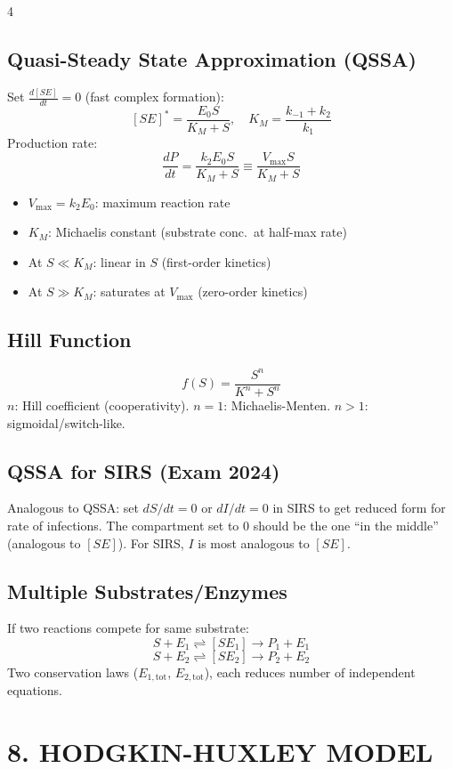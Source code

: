 \documentclass[8pt,landscape]{article}
\begin{document}
\begin{multicols}{4}
\subsection{Quasi-Steady State Approximation (QSSA)}
Set $\frac{d[SE]}{dt} = 0$ (fast complex formation):
\[
[SE]^* = \frac{E_0 S}{K_M + S}, \quad K_M = \frac{k_{-1} + k_2}{k_1}
\]
Production rate:
\[
\frac{dP}{dt} = \frac{k_2 E_0 S}{K_M + S} \equiv \frac{V_{\max} S}{K_M + S}
\]
\begin{itemize}
  \item $V_{\max} = k_2 E_0$: maximum reaction rate
  \item $K_M$: Michaelis constant (substrate conc.\ at half-max rate)
  \item At $S \ll K_M$: linear in $S$ (first-order kinetics)
  \item At $S \gg K_M$: saturates at $V_{\max}$ (zero-order kinetics)
\end{itemize}

\subsection{Hill Function}
\[
f(S) = \frac{S^n}{K^n + S^n}
\]
$n$: Hill coefficient (cooperativity). $n=1$: Michaelis-Menten. $n>1$: sigmoidal/switch-like.

\subsection{QSSA for SIRS (Exam 2024)}
Analogous to QSSA: set $dS/dt = 0$ or $dI/dt = 0$ in SIRS to get reduced form for rate of infections. The compartment set to 0 should be the one ``in the middle'' (analogous to $[SE]$). For SIRS, $I$ is most analogous to $[SE]$.

\subsection{Multiple Substrates/Enzymes}
If two reactions compete for same substrate:
\[
S + E_1 \rightleftharpoons [SE_1] \to P_1 + E_1
\]
\[
S + E_2 \rightleftharpoons [SE_2] \to P_2 + E_2
\]
Two conservation laws ($E_{1,\text{tot}}$, $E_{2,\text{tot}}$), each reduces number of independent equations.

\section{8. HODGKIN-HUXLEY MODEL}


\end{multicols}
\end{document}
